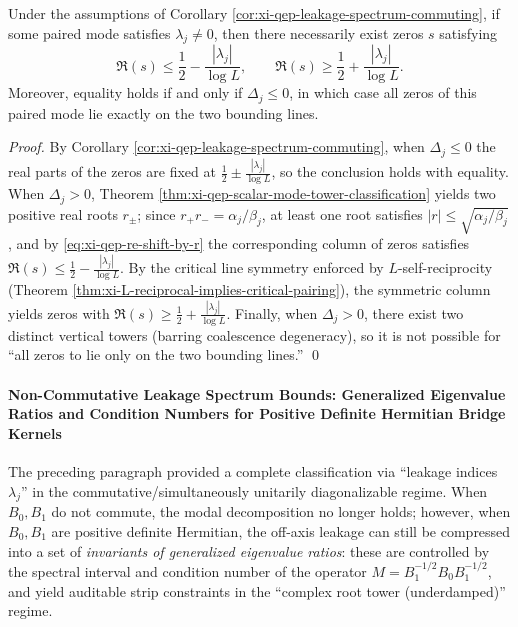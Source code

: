\begin{corollary}\label{cor:xi-qep-leakage-lower-bound}
Under the assumptions of Corollary \ref{cor:xi-qep-leakage-spectrum-commuting}, if some paired mode satisfies \(\lambda_j\neq 0\), then there necessarily exist zeros \(s\) satisfying
\[
\Re(s)\le \frac12-\frac{|\lambda_j|}{\log L},
\qquad
\Re(s)\ge \frac12+\frac{|\lambda_j|}{\log L}.
\]
Moreover, equality holds if and only if \(\Delta_j\le 0\), in which case all zeros of this paired mode lie exactly on the two bounding lines.
\end{corollary}

\begin{proof}
By Corollary \ref{cor:xi-qep-leakage-spectrum-commuting}, when \(\Delta_j\le 0\) the real parts of the zeros are fixed at \(\frac12\pm\frac{|\lambda_j|}{\log L}\), so the conclusion holds with equality.
When \(\Delta_j>0\), Theorem \ref{thm:xi-qep-scalar-mode-tower-classification} yields two positive real roots \(r_{\pm}\); since \(r_{+}r_{-}=\alpha_j/\beta_j\), at least one root satisfies \(|r|\le \sqrt{\alpha_j/\beta_j}\), and by \eqref{eq:xi-qep-re-shift-by-r} the corresponding column of zeros satisfies \(\Re(s)\le \frac12-\frac{|\lambda_j|}{\log L}\).
By the critical line symmetry enforced by \(L\)-self-reciprocity (Theorem \ref{thm:xi-L-reciprocal-implies-critical-pairing}), the symmetric column yields zeros with \(\Re(s)\ge \frac12+\frac{|\lambda_j|}{\log L}\).
Finally, when \(\Delta_j>0\), there exist two distinct vertical towers (barring coalescence degeneracy), so it is not possible for ``all zeros to lie only on the two bounding lines.'' \qed
\end{proof}

\paragraph{Non-Commutative Leakage Spectrum Bounds: Generalized Eigenvalue Ratios and Condition Numbers for Positive Definite Hermitian Bridge Kernels}
The preceding paragraph provided a complete classification via ``leakage indices \(\lambda_j\)'' in the commutative/simultaneously unitarily diagonalizable regime.
When \(B_0,B_1\) do not commute, the modal decomposition no longer holds; however, when \(B_0,B_1\) are positive definite Hermitian, the off-axis leakage can still be compressed into a set of \emph{invariants of generalized eigenvalue ratios}:
these are controlled by the spectral interval and condition number of the operator \(M=B_1^{-1/2}B_0B_1^{-1/2}\), and yield auditable strip constraints in the ``complex root tower (underdamped)'' regime.

